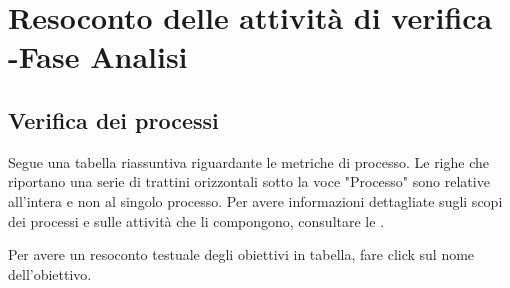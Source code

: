 \newpage

\section{Resoconto delle attività di verifica -Fase Analisi}
	\subsection{Verifica dei processi}
		
		Segue una tabella riassuntiva riguardante le metriche di processo. Le righe che riportano una serie di trattini orizzontali sotto la voce "Processo" sono relative all'intera  e non al singolo processo.
		Per avere informazioni dettagliate sugli scopi dei processi e sulle attività che li compongono, consultare le \ndpv.
		
		
		Per avere un resoconto testuale degli obiettivi in tabella, fare click sul nome dell'obiettivo.
		
